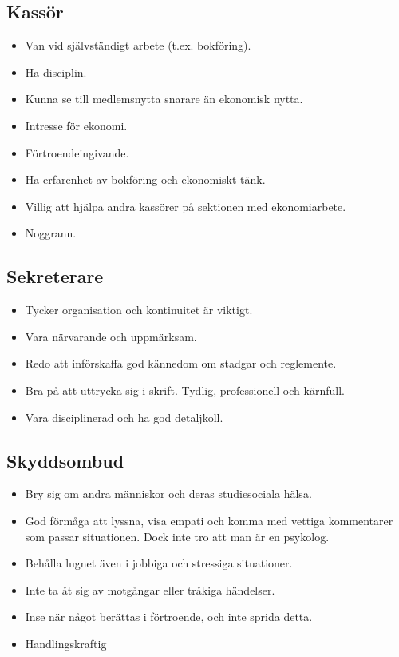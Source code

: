 \documentclass[a4paper]{article}
\begin{document}
\subsection*{Kassör}
\begin{itemize}
\item Van vid självständigt arbete (t.ex. bokföring).
\item Ha disciplin.
\item Kunna se till medlemsnytta snarare än ekonomisk nytta.
\item Intresse för ekonomi.
\item Förtroendeingivande.
\item Ha erfarenhet av bokföring och ekonomiskt tänk.
\item Villig att hjälpa andra kassörer på sektionen med ekonomiarbete.
\item Noggrann.
\end{itemize}

\subsection*{Sekreterare}
\begin{itemize}
\item Tycker organisation och kontinuitet är viktigt.
\item Vara närvarande och uppmärksam.
\item Redo att införskaffa god kännedom om stadgar och reglemente.
\item Bra på att uttrycka sig i skrift. Tydlig, professionell och kärnfull.
\item Vara disciplinerad och ha god detaljkoll.
\end{itemize}

\subsection*{Skyddsombud}
\begin{itemize}
\item Bry sig om andra människor och deras studiesociala hälsa.
\item God förmåga att lyssna, visa empati och komma med vettiga kommentarer som passar situationen. Dock inte tro att man är en psykolog.
\item Behålla lugnet även i jobbiga och stressiga situationer. 
\item Inte ta åt sig av motgångar eller tråkiga händelser.
\item Inse när något berättas i förtroende, och inte sprida detta. 
\item Handlingskraftig
\end{itemize}
        
\end{document}
